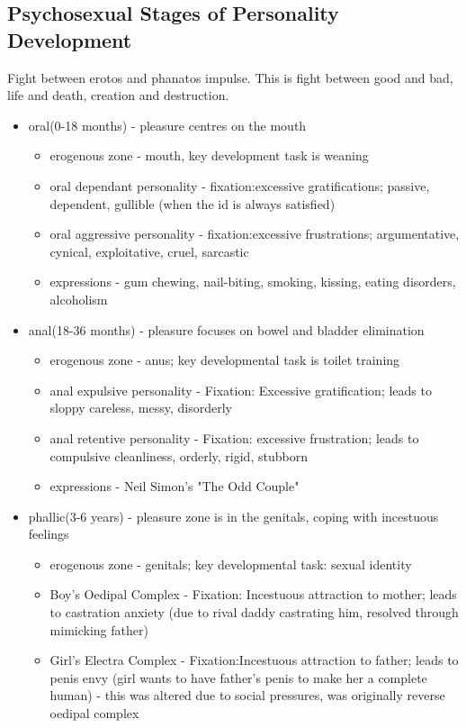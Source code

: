 \documentclass{article}
\begin{document}
\subsection*{Psychosexual Stages of Personality Development}
Fight between erotos and phanatos impulse. This is fight between good and bad, life and death, creation and destruction.
\begin{itemize}
\item oral(0-18 months) - pleasure centres on the mouth
\begin{itemize}
\item erogenous zone - mouth, key development task is weaning
\item oral dependant personality - fixation:excessive gratifications; passive, dependent, gullible (when the id is always satisfied)
\item oral aggressive personality - fixation:excessive frustrations; argumentative, cynical, exploitative, cruel, sarcastic
\item expressions - gum chewing, nail-biting, smoking, kissing, eating disorders, alcoholism
\end{itemize}
\item anal(18-36 months) - pleasure focuses on bowel and bladder elimination
\begin{itemize}
\item erogenous zone - anus; key developmental task is toilet training
\item anal expulsive personality - Fixation: Excessive gratification; leads to sloppy careless, messy, disorderly
\item anal retentive personality - Fixation: excessive frustration; leads to compulsive cleanliness, orderly, rigid, stubborn
\item expressions - Neil Simon's "The Odd Couple"
\end{itemize}
\item phallic(3-6 years) - pleasure zone is in the genitals, coping with incestuous feelings
\begin{itemize}
\item erogenous zone - genitals; key developmental task: sexual identity
\item Boy's Oedipal Complex - Fixation: Incestuous attraction to mother; leads to castration anxiety (due to rival daddy castrating him, resolved through mimicking father)
\item Girl's Electra Complex - Fixation:Incestuous attraction to father; leads to penis envy (girl wants to have father's penis to make her a complete human) - this was altered due to social pressures, was originally reverse oedipal complex

\end{itemize}
\end{itemize}
\end{document}
